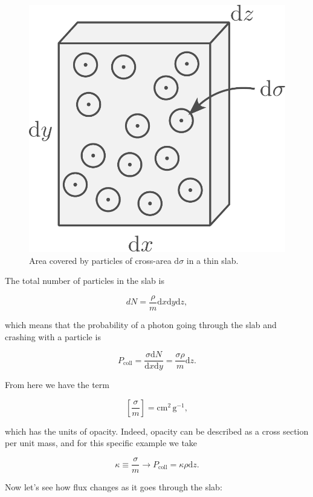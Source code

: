 \documentclass[twocolumn]{article}
\begin{document}
\begin{figure}
\centering
\includegraphics{../assets/5_radiative/opacity.pdf}
\caption{Area covered by particles of cross-area \(\mathrm{d}\sigma\) in
a thin slab.}
\end{figure}

The total number of particles in the slab is

\[dN = \frac{\rho}{m}\mathrm{d}x\mathrm{d}y\mathrm{d}z,\]

which means that the probability of a photon going through the slab and
crashing with a particle is

\[P_\mathrm{coll}=\frac{\sigma \mathrm{d}N}{\mathrm{d}x\mathrm{d}y}=\frac{\sigma \rho}{m}\mathrm{d}z.\]

From here we have the term

\[\left[\frac{\sigma}{m}\right]=\mathrm{cm^2\,g^{-1}},\]

which has the units of opacity. Indeed, opacity can be described as a
cross section per unit mass, and for this specific example we take

\[\kappa\equiv \frac{\sigma}{m}\rightarrow P_\mathrm{coll}=\kappa\rho\mathrm{d}z.\]

Now let's see how flux changes as it goes through the slab:
\end{document}
